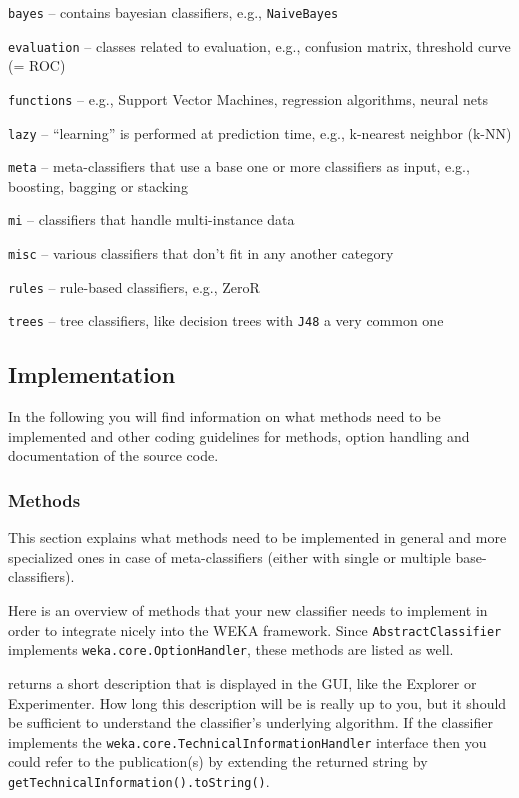 \begin{tight_itemize}
  \item \texttt{bayes} -- contains bayesian classifiers, e.g.,
\texttt{NaiveBayes}
  \item \texttt{evaluation} -- classes related to evaluation, e.g., confusion
matrix, threshold curve (= ROC)
  \item \texttt{functions} -- e.g., Support Vector Machines, regression
algorithms, neural nets
  \item \texttt{lazy} -- ``learning'' is performed at prediction time, e.g.,
k-nearest neighbor (k-NN)
  \item \texttt{meta} -- meta-classifiers that use a base one or more
classifiers as input, e.g., boosting, bagging or stacking
  \item \texttt{mi} -- classifiers that handle multi-instance data
  \item \texttt{misc} -- various classifiers that don't fit in any another
category
  \item \texttt{rules} -- rule-based classifiers, e.g., ZeroR
  \item \texttt{trees} -- tree classifiers, like decision trees with
\texttt{J48} a very common one
\end{tight_itemize}

\newpage

\subsection{Implementation}
In the following you will find information on what methods need to be
implemented and other coding guidelines for methods, option handling and
documentation of the source code.

\subsubsection{Methods}
\label{classifier_methods}
This section explains what methods need to be implemented in general and more
specialized ones in case of meta-classifiers (either with single or multiple
base-classifiers).

Here is an overview of methods that your new classifier needs to implement in
order to integrate nicely into the WEKA framework. Since
\texttt{AbstractClassifier} implements
\texttt{weka.core.OptionHandler}, these methods are listed as well.

returns a short description that is displayed in the GUI, like the Explorer or
Experimenter. How long this description will be is really up to you, but it
should be sufficient to understand the classifier's underlying algorithm. If the
classifier implements the \texttt{weka.core.TechnicalInformationHandler}
interface then you could refer to the publication(s) by extending the returned
string by \texttt{getTechnicalInformation().toString()}.

